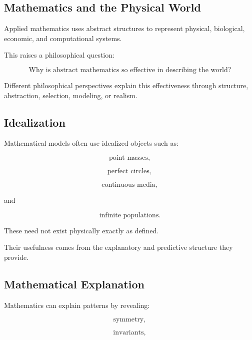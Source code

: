\subsection{Mathematics and the Physical World}
\label{subsec:mathematics-physical-world}

Applied mathematics uses abstract structures to represent physical,
biological, economic, and computational systems.

This raises a philosophical question:

\[
\boxed{
\text{Why is abstract mathematics so effective in describing the world?}
}
\]

Different philosophical perspectives explain this effectiveness through
structure, abstraction, selection, modeling, or realism.

\subsection{Idealization}
\label{subsec:mathematical-idealization}

Mathematical models often use idealized objects such as:

\[
\boxed{
\text{point masses},
}
\]

\[
\boxed{
\text{perfect circles},
}
\]

\[
\boxed{
\text{continuous media},
}
\]

and

\[
\boxed{
\text{infinite populations}.
}
\]

These need not exist physically exactly as defined.

Their usefulness comes from the explanatory and predictive structure they
provide.

\subsection{Mathematical Explanation}
\label{subsec:mathematical-explanation}

Mathematics can explain patterns by revealing:

\[
\boxed{
\text{symmetry},
}
\]

\[
\boxed{
\text{invariants},
}
\]

